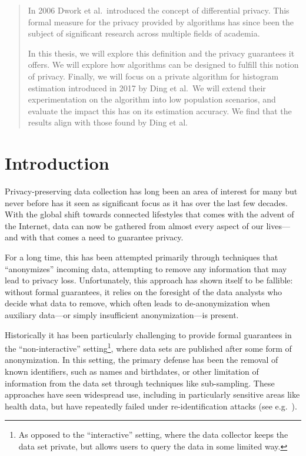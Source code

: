 \documentclass[a4paper,12pt]{article}
\begin{document}


\renewcommand{\abstractname}{Abstract}
\begin{abstract}
In 2006 Dwork et al.\ introduced the concept of differential privacy. This formal measure for the privacy provided by algorithms has since been the subject of significant research across multiple fields of academia.

In this thesis, we will explore this definition and the privacy guarantees it offers. We will explore how algorithms can be designed to fulfill this notion of privacy. Finally, we will focus on a private algorithm for histogram estimation introduced in 2017 by Ding et al.\ We will extend their experimentation on the algorithm into low population scenarios, and evaluate the impact this has on its estimation accuracy. We find that the results align with those found by Ding et al.
\end{abstract}

\thispagestyle{empty}
\newpage
\thispagestyle{empty}
\tableofcontents
\newpage
{}

\section{Introduction}

Privacy-preserving data collection has long been an area of interest for many but never before has it seen as significant focus as it has over the last few decades. With the global shift towards connected lifestyles that comes with the advent of the Internet, data can now be gathered from almost every aspect of our lives---and with that comes a need to guarantee privacy.

For a long time, this has been attempted primarily through techniques that ``anonymizes'' incoming data, attempting to remove any information that may lead to privacy loss. Unfortunately, this approach has shown itself to be fallible: without formal guarantees, it relies on the foresight of the data analysts who decide what data to remove, which often leads to de-anonymization when auxiliary data---or simply insufficient anonymization---is present.

Historically it has been particularly challenging to provide formal guarantees in the ``non-interactive'' setting\footnote{As opposed to the ``interactive'' setting, where the data collector keeps the data set private, but allows users to query the data in some limited way.}, where data sets are published after some form of anonymization. In this setting, the primary defense has been the removal of known identifiers, such as names and birthdates, or other limitation of information from the data set through techniques like sub-sampling. These approaches have seen widespread use, including in particularly sensitive areas like health data, but have repeatedly failed under re-identification attacks (see e.g.\ \cite{reidentification2011}).
\end{document}
